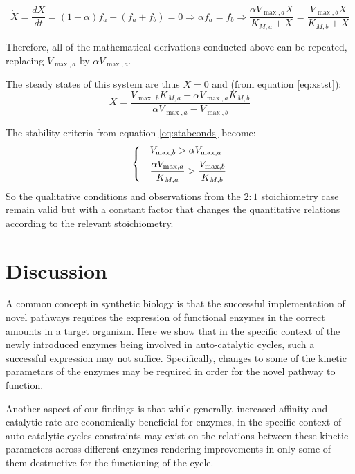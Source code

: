 \documentclass[a4page,notitlepage]{article}
\begin{document}
    \begin{equation*}
      \dot X = \frac{dX}{dt} = (1+\alpha)f_a - (f_a + f_b) = 0 \Rightarrow \alpha f_a = f_b \Rightarrow \frac{\alpha V_{\max,a}X}{K_{M,a}+X}=\frac{V_{\max,b}X}{K_{M,b}+X}
    \end{equation*}

    Therefore, all of the mathematical derivations conducted above can be repeated, replacing $V_{\max,a}$ by $\alpha V_{\max,a}$.

    The steady states of this system are thus $X=0$ and (from equation \eqref{eq:xstst}):
    \begin{equation*}
      X=\frac{V_{\max,b}K_{M,a}-\alpha V_{\max,a}K_{M,b}}{\alpha V_{\max,a}-V_{\max,b}}
    \end{equation*}

    The stability criteria from equation \eqref{eq:stabconds} become:
    \begin{equation*}
    \begin{dcases}
      & V_{\max,b}>\alpha V_{\max,a} \\
      & \frac{\alpha V_{\max,a}}{K_{M,a}}>\frac{V_{\max,b}}{K_{M,b}}
    \end{dcases}
    \end{equation*}
    So the qualitative conditions and observations from the $2:1$ stoichiometry case remain valid but with a constant factor that changes the quantitative relations according to the relevant stoichiometry.

\section{Discussion}
A common concept in synthetic biology is that the successful implementation of novel pathways requires the expression of functional enzymes in the correct amounts in a target organizm.
Here we show that in the specific context of the newly introduced enzymes being involved in auto-catalytic cycles, such a successful expression may not suffice.
Specifically, changes to some of the kinetic parametars of the enzymes may be required in order for the novel pathway to function.

Another aspect of our findings is that while generally, increased affinity and catalytic rate are economically beneficial for enzymes, in the specific context of auto-catalytic cycles constraints may exist on the relations between these kinetic parameters across different enzymes rendering improvements in only some of them destructive for the functioning of the cycle.
\end{document}
